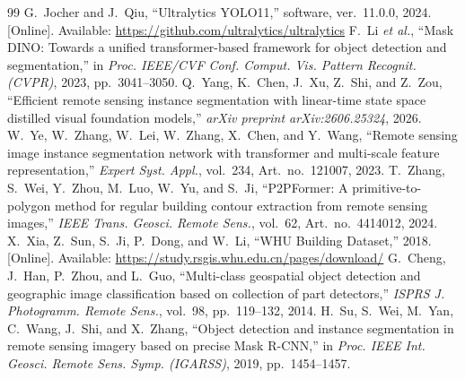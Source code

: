 \documentclass{article}
\begin{document}
\begin{thebibliography}{99}
 G.~Jocher and J.~Qiu, ``Ultralytics YOLO11,'' software, ver.~11.0.0, 2024. [Online]. Available: \url{https://github.com/ultralytics/ultralytics}
 F.~Li \textit{et al.}, ``Mask DINO: Towards a unified transformer-based framework for object detection and segmentation,'' in \textit{Proc. IEEE/CVF Conf. Comput. Vis. Pattern Recognit. (CVPR)}, 2023, pp.~3041--3050.
 Q.~Yang, K.~Chen, J.~Xu, Z.~Shi, and Z.~Zou, ``Efficient remote sensing instance segmentation with linear-time state space distilled visual foundation models,'' \textit{arXiv preprint arXiv:2606.25324}, 2026.
 W.~Ye, W.~Zhang, W.~Lei, W.~Zhang, X.~Chen, and Y.~Wang, ``Remote sensing image instance segmentation network with transformer and multi-scale feature representation,'' \textit{Expert Syst. Appl.}, vol.~234, Art.~no.~121007, 2023.
 T.~Zhang, S.~Wei, Y.~Zhou, M.~Luo, W.~Yu, and S.~Ji, ``P2PFormer: A primitive-to-polygon method for regular building contour extraction from remote sensing images,'' \textit{IEEE Trans. Geosci. Remote Sens.}, vol.~62, Art.~no.~4414012, 2024.
 X.~Xia, Z.~Sun, S.~Ji, P.~Dong, and W.~Li, ``WHU Building Dataset,'' 2018. [Online]. Available: \url{https://study.rsgis.whu.edu.cn/pages/download/}
 G.~Cheng, J.~Han, P.~Zhou, and L.~Guo, ``Multi-class geospatial object detection and geographic image classification based on collection of part detectors,'' \textit{ISPRS J. Photogramm. Remote Sens.}, vol.~98, pp.~119--132, 2014.
 H.~Su, S.~Wei, M.~Yan, C.~Wang, J.~Shi, and X.~Zhang, ``Object detection and instance segmentation in remote sensing imagery based on precise Mask R-CNN,'' in \textit{Proc. IEEE Int. Geosci. Remote Sens. Symp. (IGARSS)}, 2019, pp.~1454--1457.
\end{thebibliography}
\end{document}
